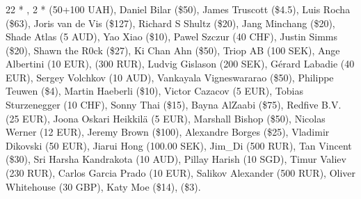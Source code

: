 \subsubsection*{}

22 * , 
2 *  (50+100 UAH), 
Daniel Bilar (\$50), 
James Truscott (\$4.5),
Luis Rocha (\$63), 
Joris van de Vis (\$127), 
Richard S Shultz (\$20), 
Jang Minchang (\$20), 
Shade Atlas (5 AUD), 
Yao Xiao (\$10),
Pawel Szczur (40 CHF), 
Justin Simms (\$20), 
Shawn the R0ck (\$27), 
Ki Chan Ahn (\$50), 
Triop AB (100 SEK), 
Ange Albertini (10 EUR),
 (300 RUR), 
Ludvig Gislason (200 SEK), 
Gérard Labadie (40 EUR), 
Sergey Volchkov (10 AUD),
Vankayala Vigneswararao (\$50),
Philippe Teuwen (\$4),
Martin Haeberli (\$10),
Victor Cazacov (5 EUR),
Tobias Sturzenegger (10 CHF),
Sonny Thai (\$15),
Bayna AlZaabi (\$75),
Redfive B.V. (25 EUR),
Joona Oskari Heikkilä (5 EUR),
Marshall Bishop (\$50),
Nicolas Werner (12 EUR),
Jeremy Brown (\$100),
Alexandre Borges (\$25),
Vladimir Dikovski (50 EUR),
Jiarui Hong (100.00 SEK),
Jim\_Di (500 RUR),
Tan Vincent (\$30),
Sri Harsha Kandrakota (10 AUD),
Pillay Harish (10 SGD),
Timur Valiev (230 RUR),
Carlos Garcia Prado (10 EUR),
Salikov Alexander (500 RUR),
Oliver Whitehouse (30 GBP),
Katy Moe (\$14),
 (\$3).
